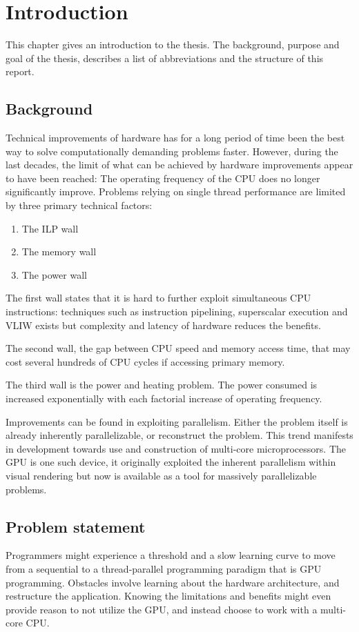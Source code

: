 \chapter{Introduction}\label{cha:intro}
This chapter gives an introduction to the thesis. The background, purpose and goal of the thesis, describes a list of abbreviations and the structure of this report.

\section{Background}
Technical improvements of hardware has for a long period of time been the best way to solve computationally demanding problems faster. However, during the last decades, the limit of what can be achieved by hardware improvements appear to have been reached: The operating frequency of the \gls{CPU} does no longer significantly improve. Problems relying on single thread performance are limited by three primary technical factors:
\begin{enumerate}
	\item The \gls{ILP} wall
	\item The memory wall
	\item The power wall
\end{enumerate}

The first wall states that it is hard to further exploit simultaneous \gls{CPU} instructions: techniques such as instruction pipelining, superscalar execution and \gls{VLIW} exists but complexity and latency of hardware reduces the benefits.

The second wall, the gap between \gls{CPU} speed and memory access time, that may cost several hundreds of \gls{CPU} cycles if accessing primary memory.

The third wall is the power and heating problem. The power consumed is increased exponentially with each factorial increase of operating frequency.

Improvements can be found in exploiting parallelism. Either the problem itself is already inherently parallelizable, or reconstruct the problem. This trend manifests in development towards use and construction of multi-core microprocessors. The \gls{GPU} is one such device, it originally exploited the inherent parallelism within visual rendering but now is available as a tool for massively parallelizable problems.

\section{Problem statement}
Programmers might experience a threshold and a slow learning curve to move from a sequential to a thread-parallel programming paradigm that is \gls{GPU} programming. Obstacles involve learning about the hardware architecture, and restructure the application. Knowing the limitations and benefits might even provide reason to not utilize the \gls{GPU}, and instead choose to work with a multi-core \gls{CPU}.

